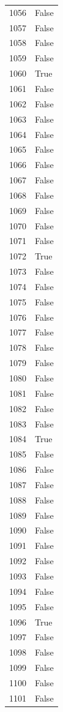 \documentclass[
  letterpaper,
  DIV=11,
  numbers=noendperiod]{scrreprt}
\begin{document}
\begin{tabular}{ll}
1056 &  False \\
1057 &  False \\
1058 &  False \\
1059 &  False \\
1060 &   True \\
1061 &  False \\
1062 &  False \\
1063 &  False \\
1064 &  False \\
1065 &  False \\
1066 &  False \\
1067 &  False \\
1068 &  False \\
1069 &  False \\
1070 &  False \\
1071 &  False \\
1072 &   True \\
1073 &  False \\
1074 &  False \\
1075 &  False \\
1076 &  False \\
1077 &  False \\
1078 &  False \\
1079 &  False \\
1080 &  False \\
1081 &  False \\
1082 &  False \\
1083 &  False \\
1084 &   True \\
1085 &  False \\
1086 &  False \\
1087 &  False \\
1088 &  False \\
1089 &  False \\
1090 &  False \\
1091 &  False \\
1092 &  False \\
1093 &  False \\
1094 &  False \\
1095 &  False \\
1096 &   True \\
1097 &  False \\
1098 &  False \\
1099 &  False \\
1100 &  False \\
1101 &  False \\

\end{tabular}
\end{document}
